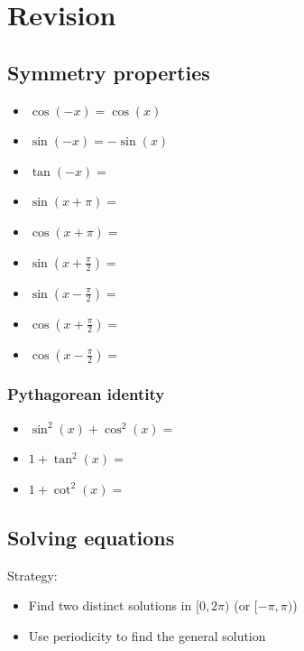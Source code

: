\documentclass[12pt]{article}
\begin{document}
\section{Revision}
\subsection{Symmetry properties}



\begin{itemize}
    \item $\cos(-x) = \cos(x)$
    \item $\sin(-x) = -\sin(x)$
    \item $\tan(-x) = $
    \item $\sin(x+\pi) =$
    \item $\cos(x+\pi) =$
    \item $\sin(x + \frac{\pi}{2}) =$
    \item $\sin(x - \frac{\pi}{2}) =$
    \item $\cos(x + \frac{\pi}{2}) =$
    \item $\cos(x - \frac{\pi}{2}) =$
\end{itemize}

\subsubsection{Pythagorean identity}
\begin{itemize}
    \item $\sin^2(x) + \cos^2(x) = $
    \item $1 + \tan^2(x) = $
    \item $1 + \cot^2(x) = $
\end{itemize}

\subsection{Solving equations}
Strategy:
\begin{itemize}
    \item Find two distinct solutions in $[0, 2\pi)$ (or $[-\pi, \pi)$)
    \item Use periodicity to find the general solution
\end{itemize}
\end{document}
